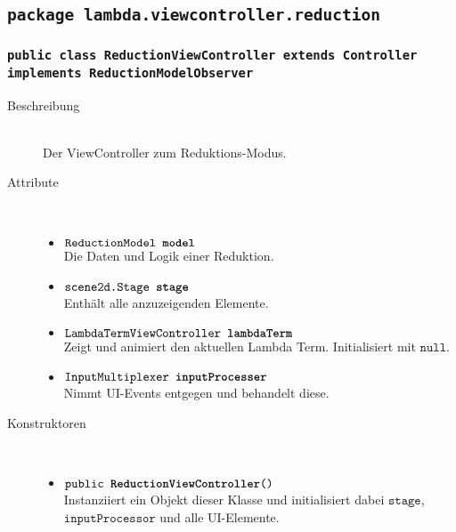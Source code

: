 \subsection{\texttt{package lambda.viewcontroller.reduction}}

\subsubsection{\normalfont \texttt{public class \textbf{ReductionViewController} extends Controller implements ReductionModelObserver}}

\begin{description}
\item[Beschreibung] \hfill \\ Der ViewController zum Reduktions-Modus.

\item[Attribute] \hfill \\
	\vspace{-.8cm}
	\begin{itemize}
		\item $\texttt{ReductionModel \textbf{model}}$ \\ Die Daten und Logik einer Reduktion.
		\item $\texttt{scene2d.Stage \textbf{stage}}$ \\ Enthält alle anzuzeigenden Elemente.
		\item $\texttt{LambdaTermViewController \textbf{lambdaTerm}}$ \\ Zeigt und animiert den aktuellen Lambda Term. Initialisiert mit $\texttt{null}$.
		\item $\texttt{InputMultiplexer \textbf{inputProcesser}}$ \\ Nimmt UI-Events entgegen und behandelt diese.
	\end{itemize}
	
\item[Konstruktoren] \hfill \\
	\vspace{-.8cm}
	\begin{itemize}
		\item $\texttt{public \textbf{ReductionViewController}()}$ \\ Instanziiert ein Objekt dieser Klasse und initialisiert dabei $\texttt{stage}$, $\texttt{inputProcessor}$ und alle UI-Elemente.
	\end{itemize}
	

\end{description}
